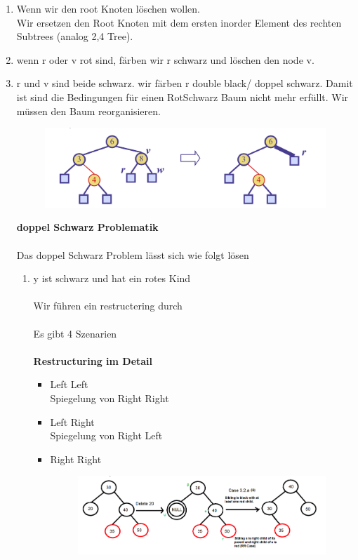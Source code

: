 \documentclass[a4paper,10pt]{report}
\begin{document}
\begin{enumerate}
	\item
		Wenn wir den root Knoten löschen wollen.\\
		Wir ersetzen den Root Knoten mit dem ersten inorder Element des rechten Subtrees (analog 2,4 Tree).
	\item
	wenn r oder v rot sind, färben wir r schwarz und löschen den node v.
	\item
	r und v sind beide schwarz. wir färben r double black/ doppel schwarz. Damit ist sind die Bedingungen für einen RotSchwarz Baum nicht mehr erfüllt. Wir müssen den Baum reorganisieren.
\begin{figure}[H]
	\begin{center}
  		\includegraphics[width=\textwidth]{img/redblackdoubleblack.png}
	\end{center}
\end{figure}
	\newpage
	\textbf{doppel Schwarz Problematik}\\
	\\
	Das doppel Schwarz Problem lässt sich wie folgt lösen
	\begin{enumerate}	
		\item
			y ist schwarz und hat ein rotes Kind\\
			\\
			Wir führen ein restructering durch\\
			\\
			Es gibt 4 Szenarien\\
			\\
			\textbf{Restructuring im Detail}
			\begin{itemize}
				\item
				Left Left\\
				Spiegelung von Right Right
				\item
				Left Right\\
				Spiegelung von Right Left
				\item
				Right Right
				\begin{figure}[H]
					\begin{center}
  						\includegraphics[width=\textwidth]{img/doubleblackdeleteRR.png}

\end{center}
\end{figure}
\end{itemize}
\end{enumerate}
\end{enumerate}
\end{document}

